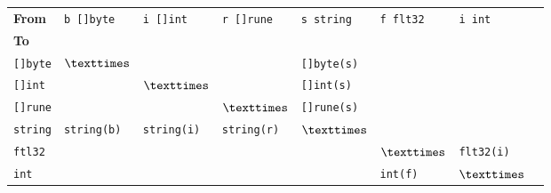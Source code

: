 \begin{tabular}{llllllll}
    \textbf{From}	 &  \verb|b []byte|& \verb|i []int| & \verb|r []rune| & \verb|s string|     & \verb|f flt32|	&  \verb|i int|	\\ \cmidrule(r){1-7}
      \textbf{To}	 &		    &                 &   &			   &			& \\ \cmidrule(r){1-1}
  \verb|[]byte|    & $\texttimes$	    &                 &   & \verb|[]byte(s)|	   &			& \\
  \verb|[]int|     &		    & $\texttimes$            &   & \verb|[]int(s)|	   &			& \\
  \verb|[]rune|    &                &                         & $\texttimes$  &  \verb|[]rune(s)| &                    & \\
  \verb|string|    &\verb|string(b)| &\verb|string(i)|      &  \verb|string(r)| &	$\texttimes$	   &			& \\
 \verb|ftl32|	 &		    &                         &   &			   & $\texttimes$	& \verb|flt32(i)|\\
     \verb|int|	 &		    &                         &   &			   & \verb|int(f)|	& $\texttimes$ \\
\end{tabular}

